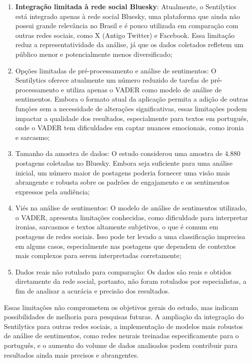 \documentclass[
	12pt,				%
	oneside,			%
	a4paper,			%
	english,			%
	french,				%
	spanish,			%
	brazil				%
	]{abntex2}
\begin{document}
\begin{enumerate}
\def\labelenumi{\arabic{enumi})}
\item
  \textbf{Integração limitada à rede social Bluesky}: Atualmente, o
  Sentilytics está integrado apenas à rede social Bluesky, uma
  plataforma que ainda não possui grande relevância no Brasil e é pouco
  utilizada em comparação com outras redes sociais, como X (Antigo
  Twitter) e Facebook. Essa limitação reduz a representatividade da
  análise, já que os dados coletados refletem um público menor e
  potencialmente menos diversificado;
\item
  Opções limitadas de pré-processamento e análise de sentimentos: O
  Sentilytics oferece atualmente um número reduzido de tarefas de
  pré-processamento e utiliza apenas o VADER como modelo de análise de
  sentimentos. Embora o formato atual da aplicação permita a adição de
  outras funções sem a necessidade de alterações significativas, essas
  limitações podem impactar a qualidade dos resultados, especialmente
  para textos em português, onde o VADER tem dificuldades em captar
  nuances emocionais, como ironia e sarcasmo;
\item
  Tamanho da amostra de dados: O estudo considerou uma amostra de 4.880
  postagens coletadas no Bluesky. Embora seja suficiente para uma
  análise inicial, um número maior de postagens poderia fornecer uma
  visão mais abrangente e robusta sobre os padrões de engajamento e os
  sentimentos expressos pela audiência;
\item
  Viés na análise de sentimentos: O modelo de análise de sentimentos
  utilizado, o VADER, apresenta limitações conhecidas, como dificuldade
  para interpretar ironias, sarcasmos e textos altamente subjetivos, o
  que é comum em postagens de redes sociais. Isso pode ter levado a uma
  classificação imprecisa em alguns casos, especialmente nas postagens
  que dependem de contextos mais complexos para serem interpretadas
  corretamente;
\item
  Dados reais não rotulado para comparação: Os dados são reais e obtidos
  diretamente da rede social, portanto, não foram rotulados por
  especialistas, a fim de analisar a acurácia e precisão dos resultados.
\end{enumerate}

Essas limitações não comprometem os objetivos gerais do estudo, mas
indicam possibilidades de melhoria para pesquisas futuras. A ampliação
da integração do Sentilytics para outras redes sociais, a implementação
de modelos mais robustos de análise de sentimentos, como redes neurais
treinadas especificamente para o português, e o aumento do volume de
dados analisados podem contribuir para resultados ainda mais precisos e
abrangentes.
\end{document}
